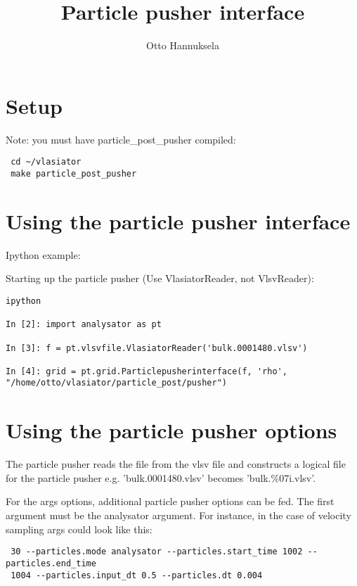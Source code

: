 \documentclass[a4paper,10pt]{article}
\title{Particle pusher interface}
\author{Otto Hannuksela}
\begin{document}
\maketitle

\tableofcontents

\newpage

\section{Setup}

Note: you must have particle\_post\_pusher compiled:

\begin{verbatim}
 cd ~/vlasiator
 make particle_post_pusher
\end{verbatim}


\section{Using the particle pusher interface}

Ipython example:

Starting up the particle pusher (Use VlasiatorReader, not VlsvReader):

\begin{verbatim}
ipython

In [2]: import analysator as pt

In [3]: f = pt.vlsvfile.VlasiatorReader('bulk.0001480.vlsv')

In [4]: grid = pt.grid.Particlepusherinterface(f, 'rho', 
"/home/otto/vlasiator/particle_post/pusher")
\end{verbatim}

\section{Using the particle pusher options}

The particle pusher reads the file from the vlsv file and constructs a logical file for the particle pusher e.g. 'bulk.0001480.vlsv' becomes 'bulk.\%07i.vlsv'.

For the args options, additional particle pusher options can be fed. The first argument must be the analysator argument. For instance, in the case of velocity sampling args could 
look like this:

\begin{verbatim}
 30 --particles.mode analysator --particles.start_time 1002 --particles.end_time 
 1004 --particles.input_dt 0.5 --particles.dt 0.004
\end{verbatim}
\end{document}
